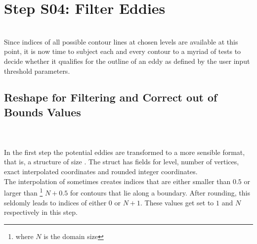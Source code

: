 \section{Step S04: Filter Eddies} \label{S:04}
\\
Since indices of all possible contour lines at chosen levels are available at
this point, it is now time to subject each and every contour to a
myriad of tests to decide whether it qualifies for the outline of an eddy as
defined by the user input threshold parameters.
\subsection{Reshape for Filtering and Correct out of Bounds Values}
\\
\noindent{}\\
In the first step the potential eddies are transformed to a more sensible
format, that is, a structure  of size . The struct has fields for level, number of
vertices, exact \ie interpolated coordinates and rounded integer coordinates.\\
The interpolation of  sometimes creates indices that are
either smaller than $0.5$ or larger than \footnote{where $N$ is the
domain size} $N+0.5$ for contours that lie along a boundary. After rounding, this
seldomly leads to indices of either $0$ or $N+1$. These values get set to $1$
and $N$ respectively in this step.
